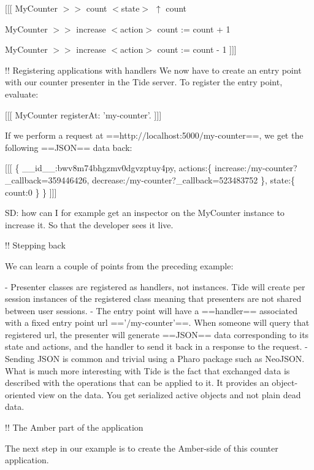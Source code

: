 \documentclass[a4paper,10pt,twoside]{book}
\begin{document}
\begin{todo}
{{[}{[}{[}
MyCounter $>$$>$ count
    $<$state$>$
    $\uparrow$ count

MyCounter $>$$>$ increase
    $<$action$>$
    count := count + 1

MyCounter $>$$>$ increase
    $<$action$>$
    count := count - 1
{]}{]}{]}

!! Registering applications with handlers
We now have to create an entry point with our counter presenter in the Tide server.
To register the entry point, evaluate:

{[}{[}{[}
MyCounter registerAt: 'my-counter'.
{]}{]}{]}


If we perform a request at ==http:$/$$/$localhost:5000$/$my-counter==, we get the following 
==JSON== data back:

{[}{[}{[}
\{
  \_\_id\_\_:bwv8m74bhgzmv0dgvzptuy4py,
  actions:\{
    increase:$/$my-counter?\_callback=359446426,
    decrease:$/$my-counter?\_callback=523483752
  \},
  state:\{
    count:0
  \}
\}
{]}{]}{]}

SD: how can I for example get an inspector on the MyCounter instance to increase it. So that the developer sees it live.



!! Stepping back

We can learn a couple of points from the preceding example:

- Presenter classes are registered as handlers, not instances. Tide will create per session instances of the registered class meaning that presenters are not shared between user sessions.
- The entry point will have a ==handler== associated with a fixed entry point  url =='$/$my-counter'==. When someone will query that registered url, the presenter will generate ==JSON== data corresponding to its state and actions, and the handler to send it back in a response to the request.
- Sending JSON is common and trivial using a Pharo package such as NeoJSON. What is much more interesting with Tide is the fact that exchanged data is described with the operations that can be applied to it. It provides an object-oriented view on the data. You get serialized active objects and not plain dead data.


!! The Amber part of the application

The next step in our example is to create the Amber-side of this counter application.

}
\end{todo}
\end{document}
